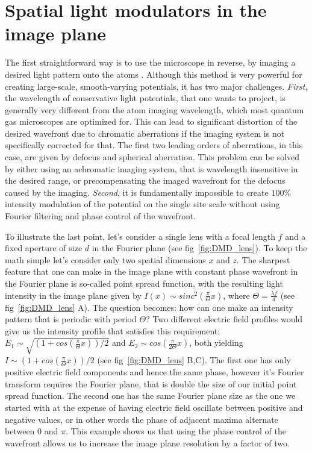 \section{Spatial light modulators in the image plane}
The first straightforward way is to use the microscope in reverse, by imaging a desired light pattern onto the atoms \cite{P. Schauß thesis, RMA thesis, MAZU thesis}. Although this method is very powerful for creating large-scale, smooth-varying potentials, it has two major challenges. \textit{First}, the wavelength of conservative light potentials, that one wants to project, is generally very different from the atom imaging wavelength, which most quantum gas microscopes are optimized for. This can lead to significant distortion of the desired wavefront due to chromatic aberrations if the imaging system is not specifically corrected for that. The first two leading orders of aberrations, in this case, are given by defocus and spherical aberration. This problem can be solved by either using an achromatic imaging system, that is wavelength insensitive in the desired range, or precompensating the imaged wavefront for the defocus caused by the imaging. \textit{Second}, it is fundamentally impossible to create $100 \%$ intensity modulation of the potential on the single site scale without using Fourier filtering and phase control of the wavefront. 

To illustrate the last point, let's consider a single lens with a focal length $f$ and a fixed aperture of size $d$ in the Fourier plane (see fig~\ref{fig:DMD_lens}). To keep the math simple let's consider only two spatial dimensions $x$ and $z$. The sharpest feature that one can make in the image plane with constant phase wavefront in the Fourier plane is so-called point spread function, with the resulting light intensity in the image plane given by $I(x) \sim sinc^2(\frac{\pi}{\Theta} x)$, where $\Theta = \frac{\lambda f}{d}$ (see fig~\ref{fig:DMD_lens} A). The question becomes: how can one make an intensity pattern that is periodic with period $\Theta$? Two different electric field profiles would give us the intensity profile that satisfies this requirement: $E_1 \sim \sqrt{(1+cos(\frac{\pi}{\Theta}x))/2}$ and $E_2 \sim cos(\frac{\pi}{2\Theta} x)$, both yielding $I \sim (1+cos(\frac{\pi}{\Theta}x))/2$ (see fig~\ref{fig:DMD_lens} B,C). The first one has only positive electric field components and hence the same phase, however it's Fourier transform requires the Fourier plane, that is double the size of our initial point spread function. The second one has the same Fourier plane size as the one we started with at the expense of having electric field oscillate between positive and negative values, or in other words the phase of adjacent maxima alternate between $0$ and $\pi$. This example shows us that using the phase control of the wavefront allows us to increase the image plane resolution by a factor of two.

